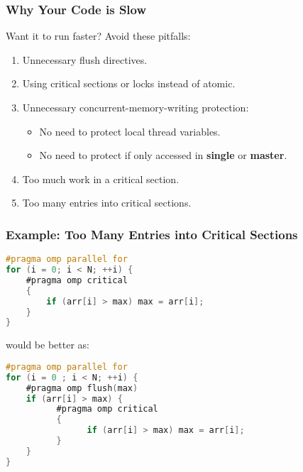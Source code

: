 \begin{frame}
  \frametitle{Why Your Code is Slow}

  
  Want it to run faster? Avoid these pitfalls:
  \begin{enumerate}
    \item Unnecessary flush directives.
    \item Using critical sections or locks instead of atomic.
    \item Unnecessary concurrent-memory-writing protection:
      \begin{itemize}
        \item No need to protect local thread variables.
        \item No need to protect if only accessed in {\bf single} or
          {\bf master}.
      \end{itemize}
    \item Too much work in a critical section.
    \item Too many entries into critical sections.
  \end{enumerate}
  
\end{frame}

\begin{frame}[fragile]
  \frametitle{Example: Too Many Entries into Critical Sections}

  
  \begin{lstlisting}[language=C,morekeywords={foreach,pragma,omp,parallel,single,nowait,task,untied,barrier,taskyield,mergeable,final,taskwait,critical}]
#pragma omp parallel for
for (i = 0; i < N; ++i) { 
    #pragma omp critical
    {
        if (arr[i] > max) max = arr[i];
    } 
}
  \end{lstlisting}

would be better as:

  \begin{lstlisting}[language=C,morekeywords={foreach,pragma,omp,parallel,single,nowait,task,untied,barrier,taskyield,mergeable,final,taskwait,critical}]
#pragma omp parallel for
for (i = 0 ; i < N; ++i) { 
    #pragma omp flush(max)
    if (arr[i] > max) {
          #pragma omp critical
          {
                if (arr[i] > max) max = arr[i];
          }
    }
}
  \end{lstlisting}
  
\end{frame}


